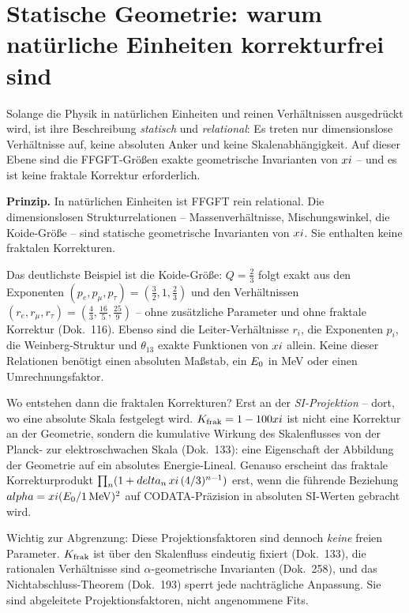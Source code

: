 \section{Statische Geometrie: warum natürliche Einheiten korrekturfrei sind}

Solange die Physik in natürlichen Einheiten und reinen Verhältnissen ausgedrückt
wird, ist ihre Beschreibung \emph{statisch} und \emph{relational}: Es treten nur
dimensionslose Verhältnisse auf, keine absoluten Anker und keine
Skalenabhängigkeit. Auf dieser Ebene sind die FFGFT-Größen exakte geometrische
Invarianten von $xi$ -- und es ist keine fraktale Korrektur erforderlich.

\begin{prinzip}
\textbf{Prinzip.} In natürlichen Einheiten ist FFGFT rein relational. Die
dimensionslosen Strukturrelationen -- Massenverhältnisse, Mischungswinkel, die
Koide-Größe -- sind statische geometrische Invarianten von $xi$. Sie
enthalten keine fraktalen Korrekturen.
\end{prinzip}

Das deutlichste Beispiel ist die Koide-Größe: $Q=\tfrac{2}{3}$ folgt exakt aus den
Exponenten $(p_e,p_\mu,p_\tau)=(\tfrac{3}{2},1,\tfrac{2}{3})$ und den
Verhältnissen $(r_e,r_\mu,r_\tau)=(\tfrac{4}{3},\tfrac{16}{5},\tfrac{25}{9})$ --
ohne zusätzliche Parameter und ohne fraktale Korrektur (Dok.~116). Ebenso sind die
Leiter-Verhältnisse $r_i$, die Exponenten $p_i$, die Weinberg-Struktur und
$\theta_{13}$ exakte Funktionen von $xi$ allein. Keine dieser Relationen
benötigt einen absoluten Maßstab, ein $E_0$ in MeV oder einen
Umrechnungsfaktor.

Wo entstehen dann die fraktalen Korrekturen? Erst an der \emph{SI-Projektion} --
dort, wo eine absolute Skala festgelegt wird. $K_{\text{frak}}=1-100xi$ ist nicht eine
Korrektur an der Geometrie, sondern die kumulative Wirkung des Skalenflusses von
der Planck- zur elektroschwachen Skala (Dok.~133): eine Eigenschaft der Abbildung
der Geometrie auf ein absolutes Energie-Lineal. Genauso erscheint das fraktale
Korrekturprodukt $\prod_n(1+delta_n\,xi\,(4/3)^{n-1})$ erst, wenn die führende
Beziehung $alpha=xi(E_0/1\,\mathrm{MeV})^2$ auf CODATA-Präzision in
absoluten SI-Werten gebracht wird.

Wichtig zur Abgrenzung: Diese Projektionsfaktoren sind dennoch \emph{keine} freien
Parameter. $K_{\text{frak}}$ ist über den Skalenfluss eindeutig fixiert (Dok.~133), die
rationalen Verhältnisse sind $\alpha$-geometrische Invarianten (Dok.~258), und das
Nichtabschluss-Theorem (Dok.~193) sperrt jede nachträgliche Anpassung. Sie sind
abgeleitete Projektionsfaktoren, nicht angenommene Fits.

